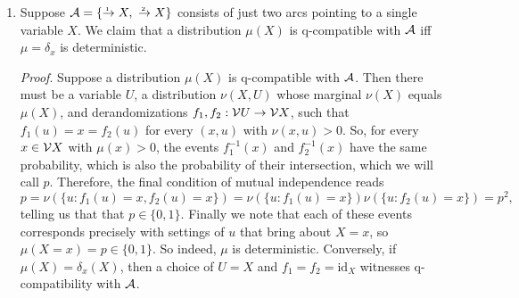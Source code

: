 \documentclass{article}
\begin{document}
\begin{example}
    \begin{enumerate}[label=\textbf{(\alph*)}]
    \item Suppose $\Ar = \{ \ed1{}X, ~ \ed2{}X \}$ consists of just two arcs pointing to a single variable $X$. 
    We claim that a distribution $\mu(X)$ is q-compatible with $\mathcal A$ iff $\mu = \delta_x$ is deterministic. 
    
    \textit{Proof}. 
    Suppose a distribution $\mu(X)$ is q-compatible with $\mathcal A$. Then there must be a variable $U$, a distribution $\nu(X,U)$ whose marginal $\nu(X)$ equals $\mu(X)$, and derandomizations $f_1, f_2 : \mathcal V U \to \mathcal V X$, such that $f_1(u) = x = f_2(u)$
    for every $(x,u)$ with $\nu(x,u) > 0$.
    So, for every $x \in \mathcal V X$ with $\mu(x) > 0$, the events $f^{-1}_1(x)$ and $f_2^{-1}(x)$ have the same probability, which is also the probability of their intersection, which we will call $p$.
    Therefore, the final condition of mutual independence reads
    \[
        p = \nu(\{ u : f_1(u) {=} x, f_2(u) {=} x\}) = \nu(\{u : f_1(u) {=} x\})\nu(\{u : f_2(u) {=} x\}) = p^2,
    \]
    telling us that that $p \in \{0,1\}$. Finally we note that each of these events corresponds precisely with settings of $u$ that bring about $X=x$, so $\mu(X{=}x) = p \in \{0,1\}$. So indeed, $\mu$ is deterministic. 
    Conversely, if $\mu(X) = \delta_x(X)$, then a choice of $U = X$ and $f_1 = f_2 = \mathrm{id}_X$ witnesses q-compatibility with $\mathcal A$. 
    

\end{enumerate}
\end{example}
\end{document}
